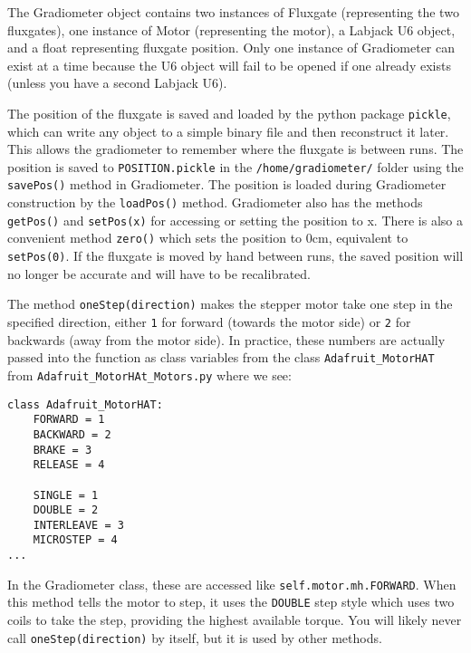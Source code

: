 \documentclass{TheMartianReport}
\newcommand{\pyinline}[1]{\texttt{#1}}
\newcommand{\shellinline}[1]{\texttt{#1}}
\begin{document}
The Gradiometer object contains two instances of Fluxgate (representing the two fluxgates), one instance of Motor (representing the motor), a Labjack U6 object, and a float representing fluxgate position.  Only one instance of Gradiometer can exist at a time because the U6 object will fail to be opened if one already exists (unless you have a second Labjack U6).

The position of the fluxgate is saved and loaded by the python package \pyinline{pickle}, which can write any object to a simple binary file and then reconstruct it later. This allows the gradiometer to remember where the fluxgate is between runs. The position is saved to \shellinline{POSITION.pickle} in the \shellinline{/home/gradiometer/} folder using the \pyinline{savePos()} method in Gradiometer. The position is loaded during Gradiometer construction by the \pyinline{loadPos()} method. Gradiometer also has the methods \pyinline{getPos()} and \pyinline{setPos(x)} for accessing or setting the position to x. There is also a convenient method \pyinline{zero()} which sets the position to 0cm, equivalent to \pyinline{setPos(0)}. If the fluxgate is moved by hand between runs, the saved position will no longer be accurate and will have to be recalibrated.

The method \pyinline{oneStep(direction)} makes the stepper motor take one step in the specified direction, either \pyinline{1} for forward (towards the motor side) or \pyinline{2} for backwards (away from the motor side). In practice, these numbers are actually passed into the function as class variables from the class \pyinline{Adafruit_MotorHAT} from \shellinline{Adafruit_MotorHAt_Motors.py} where we see:

\begin{verbatim}
class Adafruit_MotorHAT:
    FORWARD = 1
    BACKWARD = 2
    BRAKE = 3
    RELEASE = 4

    SINGLE = 1
    DOUBLE = 2
    INTERLEAVE = 3
    MICROSTEP = 4
...
\end{verbatim}
In the Gradiometer class, these are accessed like \pyinline{self.motor.mh.FORWARD}. When this method tells the motor to step, it uses the \pyinline{DOUBLE} step style which uses two coils to take the step, providing the highest available torque. You will likely never call \pyinline{oneStep(direction)} by itself, but it is used by other methods.
\end{document}
